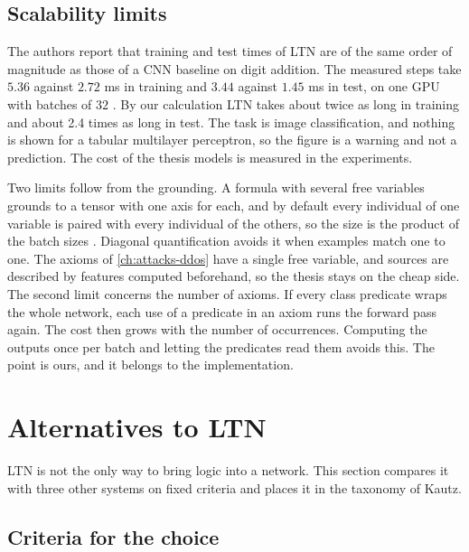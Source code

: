 \subsection{Scalability limits}
\label{sec:scalability-limits}

The authors report that training and test times of LTN are of the same order
of magnitude as those of a CNN baseline on digit addition. The measured steps
take $5.36$ against $2.72$ ms in training and $3.44$ against $1.45$ ms in
test, on one GPU with batches of $32$ \citep{badreddine2022ltn}. By our
calculation LTN takes about twice as long in training and about 2.4 times as
long in test. The task is image
classification, and nothing is shown for a tabular multilayer perceptron, so
the figure is a warning and not a prediction. The cost of the thesis models is
measured in the experiments.

Two limits follow from the grounding. A formula with several free variables
grounds to a tensor with one axis for each, and by default every individual of
one variable is paired with every individual of the others, so the size is the
product of the batch sizes \citep{badreddine2022ltn}. Diagonal quantification
avoids it when examples match one to one. The axioms of \cref{ch:attacks-ddos}
have a single free variable, and sources are described by features computed
beforehand, so the thesis stays on the cheap side. The second limit concerns the
number of axioms. If every class predicate wraps the whole network, each use of
a predicate in an axiom runs the forward pass again. The cost then grows with
the number of occurrences. Computing the outputs once per batch and letting the
predicates read them avoids this. The point is ours, and it belongs to the
implementation.

\section{Alternatives to LTN}
\label{sec:ltn-alternatives}

LTN is not the only way to bring logic into a network. This section compares it with three
other systems on fixed criteria and places it in the taxonomy of Kautz.

\subsection{Criteria for the choice}
\label{sec:ltn-vs-alternatives}

